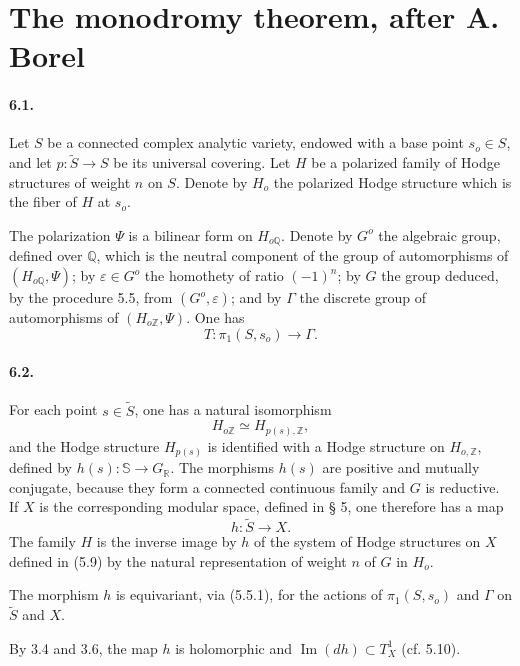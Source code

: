 \documentclass[10pt]{article}
\newcommand{\R}{\mathbb R}
\newcommand{\Z}{\mathbb Z}
\newcommand{\Q}{\mathbb Q}
\newcommand{\bS}{\mathbb S}
\theoremstyle{deligne}
\begin{document}
\section{The monodromy theorem, after A. Borel}

\paragraph{6.1.}
Let $S$ be a connected complex analytic variety, endowed with a base point $s_o\in S$, and let $p:\widetilde S\to S$ be its universal covering. Let $H$ be a polarized family of Hodge structures of weight $n$ on $S$. Denote by $H_o$ the polarized Hodge structure which is the fiber of $H$ at $s_o$.

The polarization $\Psi$ is a bilinear form on $H_{o\Q}$. Denote by $G^o$ the algebraic group, defined over $\Q$, which is the neutral component of the group of automorphisms of $(H_{o\Q},\Psi)$; by $\varepsilon\in G^o$ the homothety of ratio $(-1)^n$; by $G$ the group deduced, by the procedure 5.5, from $(G^o,\varepsilon)$; and by $\Gamma$ the discrete group of automorphisms of $(H_{o\Z},\Psi)$. One has
\[
\tag{6.1.1}
  T:\pi_1(S,s_o)\longrightarrow\Gamma .
\]

\paragraph{6.2.}
For each point $s\in\widetilde S$, one has a natural isomorphism
\[
  H_{o\Z}\simeq H_{p(s),\Z},
\]
and the Hodge structure $H_{p(s)}$ is identified with a Hodge structure on $H_{o,\Z}$, defined by $h(s):\bS\to G_\R$. The morphisms $h(s)$ are positive and mutually conjugate, because they form a connected continuous family and $G$ is reductive. If $X$ is the corresponding modular space, defined in § 5, one therefore has a map
\[
  h:\widetilde S\longrightarrow X.
\]
The family $H$ is the inverse image by $h$ of the system of Hodge structures on $X$ defined in (5.9) by the natural representation of weight $n$ of $G$ in $H_o$.

The morphism $h$ is equivariant, via (5.5.1), for the actions of $\pi_1(S,s_o)$ and $\Gamma$ on $\widetilde S$ and $X$.

By 3.4 and 3.6, the map $h$ is holomorphic and $\operatorname{Im}(dh)\subset T_X^1$ (cf. 5.10).
\end{document}

